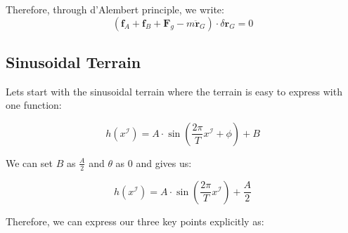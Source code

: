 \documentclass[11pt]{article}
\begin{document}
Therefore, through d'Alembert principle, we write:
\[
\left(\mathbf{f}_A + \mathbf{f}_B 
+ \mathbf{F}_g 
- m\ddot{\mathbf{r}}_G \right) 
\cdot \delta \mathbf{r}_G = 0
\]

\subsection{Sinusoidal Terrain}
\indent \indent Lets start with the sinusoidal terrain where the terrain is easy to express with one function:

\[
h(x^\mathcal{I}) = A \cdot \sin\left( \frac{2\pi}{T} x^\mathcal{I} + \phi \right) + B
\]

We can set \(B\) as \(\frac{A}{2}\) and \(\theta\) as 0 and gives us: 

\[
h(x^\mathcal{I}) = A \cdot \sin\left( \frac{2\pi}{T} x^\mathcal{I} \right) + \frac{A}{2}
\]

Therefore, we can express our three key points explicitly as:
\end{document}
